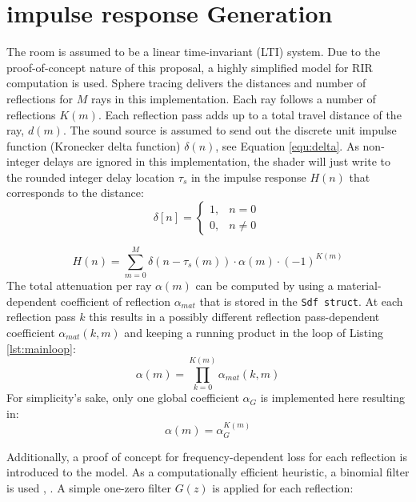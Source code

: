 \documentclass[twoside,a4paper]{article}
\begin{document}


\section{impulse response Generation}
The room is assumed to be a linear time-invariant (LTI) system. Due to the proof-of-concept nature of this proposal, a highly simplified model for RIR computation is used. Sphere tracing delivers the distances and number of reflections for $M$ rays in this implementation. Each ray follows a number of reflections $K(m)$. Each reflection pass adds up to a total travel distance of the ray, $d(m)$. The sound source is assumed to send out the discrete unit impulse function (Kronecker delta function) $\delta(n)$, see Equation \ref{equ:delta}. As non-integer delays are ignored in this implementation, the shader will just write to the rounded integer delay location $\tau_s$ in the impulse response $H(n)$ that corresponds to the distance:
\begin{equation}
\label{equ:delta}
\delta [n]={\begin{cases}1,&n=0\\0,&n\neq 0\end{cases}}\,
\end{equation}

\begin{equation}
H(n) = \sum_{m=0}^M \delta(n-\tau_s(m))\cdot \alpha(m)\cdot (-1)^{K(m)}
\end{equation}
The total attenuation per ray $\alpha(m)$ can be computed by using a material-dependent coefficient of reflection $\alpha_{mat}$ that is stored in the \texttt{Sdf struct}. At each reflection pass $k$ this results in a possibly different reflection pass-dependent coefficient $\alpha_{mat}(k,m)$ and keeping a running product in the loop of Listing \ref{lst:mainloop}:
\begin{equation}
\alpha(m)=\prod_{k=0}^{K(m)} \alpha_{mat}(k,m)
\end{equation}
For simplicity's sake, only one global coefficient $\alpha_G$ is implemented here resulting in:
\begin{equation}
\alpha(m) = \alpha_G^{K(m)}
\end{equation}

Additionally, a proof of concept for frequency-dependent loss for each reflection is introduced to the model. As a computationally efficient heuristic, a binomial filter is used \cite{aubury_binomial_1996}, \cite{derpanis_overview_nodate}. A simple one-zero filter $G(z)$ is applied for each reflection:
\end{document}

